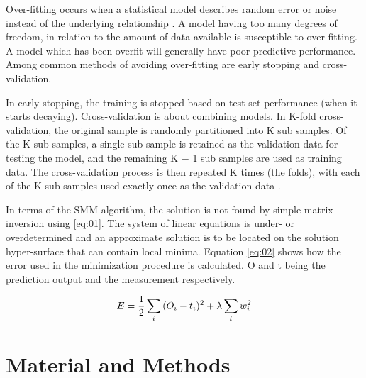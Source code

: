 \documentclass{bioinfo}
\begin{document}
\begin{application}
\par Over-fitting occurs when a statistical model describes random error or noise instead of the underlying relationship \cite{Hobohm}. A model having too many degrees of freedom, in relation to the amount of data available is susceptible to over-fitting. A model which has been overfit will generally have poor predictive performance. Among common methods of avoiding over-fitting are early stopping and cross-validation.
\par In early stopping, the training is stopped based on test set performance (when it starts decaying). Cross-validation is about combining models. In K-fold cross-validation, the original sample is randomly partitioned into K sub samples. Of the K sub samples, a single sub sample is retained as the validation data for testing the model, and the remaining K − 1 sub samples are used as training data. The cross-validation process is then repeated K times (the folds), with each of the K sub samples used exactly once as the validation data \cite{wiki:crossval}.
\par In terms of the SMM algorithm, the solution is not found by simple matrix inversion using \ref{eq:01}. The system of linear equations is under- or overdetermined and an approximate solution is to be located on the solution hyper-surface that can contain local minima. Equation \ref{eq:02} shows how the error used in the minimization procedure is calculated. O and t being the prediction output and the measurement respectively.

\begin{equation}
\label{eq:02}
E = \frac{1}{2} \sum_i{(O_i-t_i)^2} + \lambda \sum_l{w_i^2} \\
\end{equation}


\section*{Material and Methods}


\end{application}
\end{document}
